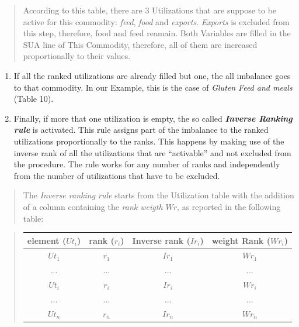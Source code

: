 \documentclass[]{article}
\begin{document}
\begin{quote}
According to this table, there are 3 Utilizations that are suppose to be
active for this commodity: \emph{feed}, \emph{food} and \emph{exports}.
\emph{Exports} is excluded from this step, therefore, food and feed
reamain. Both Variables are filled in the SUA line of This Commodity,
therefore, all of them are increased proportionally to their values.
\end{quote}

\begin{enumerate}
\def\labelenumi{\arabic{enumi}.}
\setcounter{enumi}{1}
\item
  If all the ranked utilizations are already filled but one, the all
  imbalance goes to that commodity. In our Example, this is the case of
  \emph{Gluten Feed and meals} (Table 10).
\item
  Finally, if more that one utilization is empty, the so called
  \textbf{\emph{Inverse Ranking rule}} is activated. This rule assigns
  part of the imbalance to the ranked utilizations proportionally to the
  ranks. This happens by making use of the inverse rank of all the
  utilizations that are ``activable'' and not excluded from the
  procedure. The rule works for any number of ranks and independently
  from the number of utilizations that have to be excluded.
\end{enumerate}

\begin{quote}
The \emph{Inverse ranking rule} starts from the Utilization table with
the addition of a column containing the \emph{rank weigth \(Wr\)}, as
reported in the following table:
\end{quote}

\begin{quote}
\begin{center}
\begin{tabular}{ c|c|c|c } 
\hline
element ($Ut_{i}$) & rank ($r_{i}$) & Inverse rank ($Ir_{i}$) & weight Rank ($Wr_{i}$)\\
\hline
$Ut_{1}$ & $r_{1}$ & $Ir_{1}$  & $Wr_{1}$\\ 
... & ... & ... & ...\\ 
$Ut_{i}$ & $r_{i}$ & $Ir_{i}$  & $Wr_{i}$\\ 
... & ... & ... & ...\\ 
$Ut_{n}$ & $r_{n}$ & $Ir_{n}$  & $Wr_{n}$\\ 
\hline
\end{tabular}
\end{center}
\end{quote}
\end{document}
